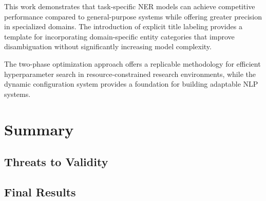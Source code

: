 \documentclass[a4paper]{usiinfbachelorproject}
\begin{document}
This work demonstrates that task-specific NER models can achieve competitive performance compared to general-purpose systems while offering greater precision in specialized domains. The introduction of explicit title labeling provides a template for incorporating domain-specific entity categories that improve disambiguation without significantly increasing model complexity.

The two-phase optimization approach offers a replicable methodology for efficient hyperparameter search in resource-constrained research environments, while the dynamic configuration system provides a foundation for building adaptable NLP systems.

\section{\textbf{Summary}}
\subsection{Threats to Validity}
\subsection{Final Results}







\newpage
	


\end{document}

